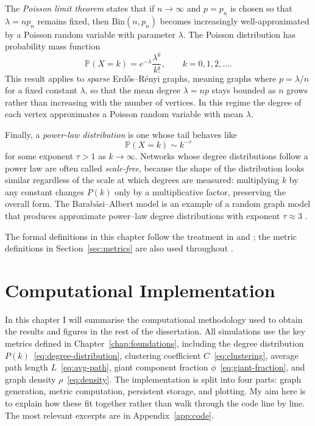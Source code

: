 \documentclass[12pt, a4paper]{report}
\theoremstyle{definition}
\theoremstyle{plain}
\theoremstyle{remark}
\begin{document}
The \emph{Poisson limit theorem} states that if $n \to \infty$ 
and $p = p_n$ is chosen so that $\lambda = np_n$ remains
fixed, then $\mathrm{Bin}(n,p_n)$ becomes increasingly
well-approximated by a Poisson random variable with parameter
$\lambda$. The Poisson distribution has probability mass function
\begin{equation}
\mathbb{P}(X = k)
= e^{-\lambda} \frac{\lambda^k}{k!},
\qquad k = 0,1,2,\dots.
\label{eq:poisson}
\end{equation}
This result applies to \emph{sparse} Erd\H{o}s--R\'enyi graphs,
meaning graphs where $p = \lambda/n$ for a fixed constant
$\lambda$, so that the mean degree $\lambda = np$ stays bounded
as $n$ grows rather than increasing with the number of vertices.
In this regime the degree of each vertex approximates a
Poisson random variable with mean $\lambda$.

Finally, a \emph{power-law distribution} is one whose tail
behaves like
\begin{equation}
\mathbb{P}(X = k) \sim k^{-\tau}
\label{eq:power-law}
\end{equation}
for some exponent $\tau > 1$ as $k \to \infty$. Networks whose 
degree distributions follow a power law are often called
\emph{scale-free}, because the shape of the distribution looks
similar regardless of the scale at which degrees are measured:
multiplying $k$ by any constant changes $P(k)$ only by a
multiplicative factor, preserving the overall form. The
Barab\'asi--Albert model is an example of a random graph model
that produces approximate power--law degree distributions with
exponent $\tau \approx 3$ \cite{albert2002}.

The formal definitions in this chapter follow the treatment
in \cite{hofstad2017} and \cite{bollobas2001}; the metric
definitions in Section~\ref{sec:metrics} are also used
throughout \cite{albert2002}.

\chapter{Computational Implementation}
\label{chap:implementation}

In this chapter I will summarise the computational methodology used to
obtain the results and figures in the rest of the dissertation. All
simulations use the key metrics defined in Chapter~\ref{chap:foundations},
including the degree distribution $P(k)$~\eqref{eq:degree-distribution},
clustering coefficient $C$~\eqref{eq:clustering}, average path length
$L$~\eqref{eq:avg-path}, giant component fraction
$\phi$~\eqref{eq:giant-fraction}, and graph density $\rho$~\eqref{eq:density}.
The implementation is split into four parts: graph generation, metric
computation, persistent storage, and plotting. My aim here is to explain
how these fit together rather than walk through the code line by line.
The most relevant excerpts are in Appendix~\ref{app:code}.
\end{document}
